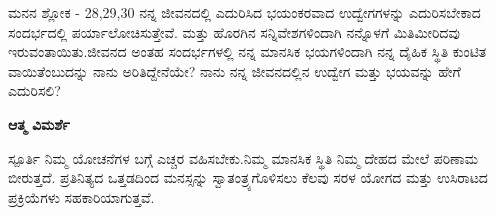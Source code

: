 

\newpage
\begin{mananam}{\kanfont ಮನನ  ಶ್ಲೋಕ - \textenglish{28,29,30}}
{\footnotesize \mananamfont ನನ್ನ ಜೀವನದಲ್ಲಿ ಎದುರಿಸಿದ ಭಯಂಕರವಾದ ಉದ್ವೇಗಗಳನ್ನು ಎದುರಿಸಬೇಕಾದ ಸಂದರ್ಭದಲ್ಲಿ ಪರ್ಯಾಲೋಚಿಸುತ್ತೇವೆ. ಮತ್ತು ಹೊರಗಿನ ಸನ್ನಿವೇಶಗಳಿಂದಾಗಿ ನನ್ನೊಳಗೆ ಮಿತಿಮೀರಿದವು ಇರುವಂತಾಯಿತು.ಜೀವನದ ಅಂತಹ ಸಂದರ್ಭಗಳಲ್ಲಿ ನನ್ನ ಮಾನಸಿಕ ಭಯಗಳಿಂದಾಗಿ ನನ್ನ ದೈಹಿಕ ಸ್ಥಿತಿ ಕುಂಟಿತ ವಾಯಿತೆಂಬುದನ್ನು ನಾನು ಅರಿತಿದ್ದೇನೆಯೇ? ನಾನು ನನ್ನ ಜೀವನದಲ್ಲಿನ ಉದ್ವೇಗ ಮತ್ತು ಭಯವನ್ನು ಹೇಗೆ ಎದುರಿಸಲಿ?}
\end{mananam}
\textbf{ಆತ್ಮ ವಿಮರ್ಶೆ}
\begin{inspiration}{\kanfont ಸ್ಪೂರ್ತಿ}
{\footnotesize \mananamfont ನಿಮ್ಮ ಯೋಚನೆಗಳ ಬಗ್ಗೆ ಎಚ್ಚರ ವಹಿಸಬೇಕು.ನಿಮ್ಮ ಮಾನಸಿಕ ಸ್ಥಿತಿ ನಿಮ್ಮ ದೇಹದ ಮೇಲೆ ಪರಿಣಾಮ ಬೀರುತ್ತದೆ. ಪ್ರತಿನಿತ್ಯದ ಒತ್ತಡದಿಂದ ಮನಸ್ಸನ್ನು ಸ್ವಾತಂತ್ರ್ಯಗೊಳಿಸಲು ಕೆಲವು ಸರಳ ಯೋಗದ ಮತ್ತು ಉಸಿರಾಟದ ಪ್ರಕ್ರಿಯೆಗಳು ಸಹಕಾರಿಯಾಗುತ್ತವೆ.}
\end{inspiration}
\newpage


